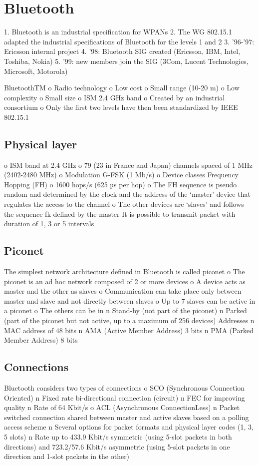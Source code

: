 \section{Bluetooth}

1. Bluetooth is an industrial specification for
WPANs
2. The WG 802.15.1 adapted the industrial
specifications of Bluetooth for the levels 1
and 2
3. ’96-’97: Ericsson internal project
4. ’98: Bluetooth SIG created (Ericsson, IBM,
Intel, Toshiba, Nokia)
5. ’99: new members join the SIG (3Com,
Lucent Technologies, Microsoft, Motorola)


BluetoothTM
o Radio technology
o Low cost
o Small range (10-20 m)
o Low complexity
o Small size
o ISM 2.4 GHz band
o Created by an industrial
consortium
o Only the first two levels
have then been
standardized by IEEE
802.15.1

\subsection{Physical layer}
o ISM band at 2.4 GHz
o 79 (23 in France and Japan) channels
spaced of 1 MHz (2402-2480 MHz)
o Modulation G-FSK (1 Mb/s)
o Device classes
Frequency Hopping (FH)
o 1600 hops/s (625 µs per hop)
o The FH sequence is pseudo random
and determined by the clock and the
address of the ‘master’ device that
regulates the access to the channel
o The other devices are ‘slaves’ and
follows the sequence fk defined by the
master
It is possible to transmit packet
with duration of 1, 3 or 5 intervals

\subsection{Piconet}
The simplest network architecture defined in
Bluetooth is called piconet
o The piconet is an ad hoc network composed
of 2 or more devices
o A device acts as master and the other as
slaves
o Communication can take place only between
master and slave and not directly between
slaves
o Up to 7 slaves can be active in a piconet
o The others can be in
n Stand-by (not part of the piconet)
n Parked (part of the piconet but not active, up to a
maximum of 256 devices)
Addresses
n MAC address of 48 bits
n AMA (Active Member Address) 3 bits
n PMA (Parked Member Address) 8 bits

\subsection{Connections}
Bluetooth considers two types of connections
o SCO (Synchronous Connection Oriented)
n Fixed rate bi-directional connection (circuit)
n FEC for improving quality
n Rate of 64 Kbit/s
o ACL (Asynchronous ConnectionLess)
n Packet switched connection shared between
master and active slaves based on a polling access
scheme
n Several options for packet formats and physical
layer codes (1, 3, 5 slots)
n Rate up to 433.9 Kbit/s symmetric (using 5-slot
packets in both directions) and 723.2/57.6 Kbit/s
asymmetric (using 5-slot packets in one direction and 1-slot packets in the other)

